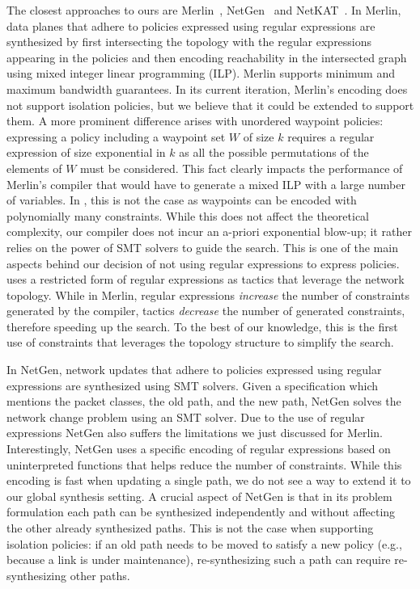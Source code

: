 The closest approaches to ours are Merlin~\cite{merlin},
NetGen~\cite{netgen} and NetKAT~\cite{netkat}.  
In Merlin, data planes that adhere to policies
expressed using regular expressions are synthesized by first
intersecting the topology with the regular expressions appearing in
the policies and then encoding reachability in the intersected graph
using mixed integer linear programming (ILP).
Merlin supports minimum and maximum bandwidth guarantees.
In its current iteration, 
Merlin's encoding does not support isolation policies, but we believe
that it could be extended to support them.  
A more prominent
difference arises with unordered waypoint policies: expressing a
policy including a waypoint set $W$ of size $k$ requires a regular
expression of size exponential in $k$ as all the possible permutations
of the elements of $W$ must be considered. This fact clearly 
impacts the performance of 
Merlin's compiler that would have to generate a mixed ILP with a
large number of variables.  In \Name, this is not the case as waypoints
can be encoded with polynomially many constraints.  While this does
not affect the theoretical complexity, our compiler does not incur
an a-priori exponential blow-up; it rather relies on the power
of SMT solvers to guide the search.  This is one of the main aspects
behind our decision of not using regular expressions to express
policies.  \Name uses a restricted form of regular expressions as 
tactics that leverage the network topology.  While in Merlin,
regular expressions \emph{increase} the number of constraints
generated by the compiler, tactics \emph{decrease}
the number of generated constraints, therefore speeding up the search.
To the best of our knowledge, this is the first use of constraints
that leverages the topology structure to simplify the search.

In NetGen, network updates that adhere to policies expressed using
regular expressions are synthesized using SMT solvers.  Given a
specification which mentions the packet classes, the old path, and the
new path, NetGen solves the network change problem using an SMT solver.
Due to the use of regular expressions NetGen also suffers the
limitations we just discussed for Merlin. Interestingly, NetGen uses
a specific encoding of regular expressions based on uninterpreted
functions that helps reduce the number of constraints. While this
encoding is fast when updating a single path, we do not see a way to
extend it to our global synthesis setting.  A crucial aspect of NetGen
is that in its problem formulation each path can be synthesized
independently and without affecting the other already synthesized
paths.  This is not the case when supporting isolation policies: if an
old path needs to be moved to satisfy a new policy (e.g., because a
link is under maintenance), re-synthesizing such a path can require
re-synthesizing other paths. 

